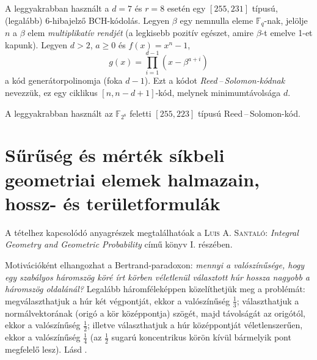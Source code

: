 \documentclass[DIV=15,appendixprefix]{scrreprt}
\theoremstyle{definition}
\theoremstyle{remark}
\begin{document}
A leggyakrabban használt a $ d = 7 $ és $ r = 8 $ esetén egy $ \left[ 255,{} 231 \right] $ típusú,
(legalább) $ 6 $-hibajelző BCH-kódolás.
%
Legyen $ \beta $ egy nemnulla eleme $ \mathbb{ F }_{ q } $-nak, jelölje $ n $ a $ \beta $ elem
\emph{multiplikatív rendjét} (a legkisebb pozitív egészet, amire $ \beta $-t emelve 1-et kapunk).
Legyen $ d > 2 $, $ a \ge 0 $ és $ f \left( x \right) = x^{ n } - 1 $,
\begin{equation*}
	g \left( x \right) = \prod_{ i = 1 }^{ d - 1 } \left( x - \beta^{ a + i } \right)
\end{equation*}
a kód generátorpolinomja (foka $ d - 1 $). Ezt a kódot \emph{Reed\,--\,Solomon-kódnak} nevezzük, ez
egy ciklikus $ \left[ n,{} n - d + 1 \right] $-kód, melynek minimumtávolsága $ d $.

A leggyakrabban használt az $ \mathbb{ F }_{ 2^{ 8 } } $ feletti $ \left[ 255, 223 \right] $ típusú
Reed\,--\,Solomon-kód.
%
\section{Sűrűség és mérték síkbeli geometriai elemek halmazain, hossz- és területformulák}
A tételhez kapcsolódó anyagrészek megtalálhatóak a \textsc{Luis A. Santaló}: \emph{Integral Geometry
and Geometric Probability} \cite{Santalo} című könyv I. részében.

Motivációként elhangozhat a Bertrand-paradoxon: \emph{mennyi a valószínűsége, hogy egy szabályos
háromszög köré írt körben véletlenül választott húr hossza nagyobb a háromszög oldalánál?}
Legalább háromféleképpen közelíthetjük meg a problémát: megválaszthatjuk a húr két végpontját, ekkor
a valószínűség $ \frac{ 1 }{ 3 } $; választhatjuk a normálvektorának (origó a kör középpontja)
szögét, majd távolságát az origótól, ekkor a valószínűség $ \frac{ 1 }{ 2 } $; illetve
választhatjuk a húr középpontját véletlenszerűen, ekkor a valószínűség $ \frac{ 1 }{ 4 } $ (az
$ \frac{ 1 }{ 2 } $ sugarú koncentrikus körön kívül bármelyik pont megfelelő lesz).
%
Lásd \cite[2.~fejezet, 1.~szakasz]{Santalo}.
\end{document}
